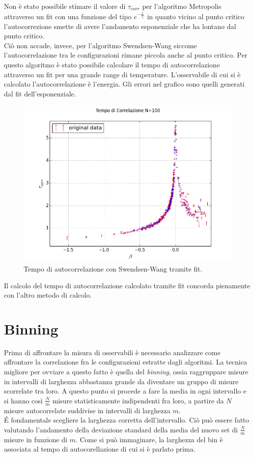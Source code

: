 Non è stato possibile stimare il valore di $\tau_{corr}$ per l'algoritmo Metropolis attraverso un fit con una funzione del tipo $e^{-\frac{t}{\tau_{c}}}$ in quanto vicino al punto critico l'autocorrezione smette di avere l'andamento esponenziale che ha lontano dal punto critico.\\
Ciò non accade, invece, per l'algoritmo Swendsen-Wang siccome l'autocorrelazione tra le configurazioni rimane piccola anche al punto critico.
Per questo algoritmo è stato possibile calcolare il tempo di autocorrelazione attraverso un fit per una grande range di temperature.
L'osservabile di cui si è calcolato l'autocorrelazione è l'energia.
Gli errori nel grafico sono quelli generati dal fit dell'esponenziale.

\begin{figure}
\centering
	\includegraphics[scale=0.55]{sw/autocorrelazioneN100fit.png}
	\caption{Tempo di autocorrelazione con Swendsen-Wang tramite fit.}
\end{figure}
Il calcolo del tempo di autocorrelazione calcolato tramite fit concorda pienamente con l'altro metodo di calcolo.\\


\section{Binning}
Prima di affrontare la misura di osservabili è necessario analizzare come affrontare la correlazione fra le configurazioni estratte dagli algoritmi.
La tecnica migliore per ovviare a questo fatto è quella del \emph{binning}, ossia raggruppare misure in intervalli di larghezza abbastanza grande da diventare un gruppo di misure scorrelate tra loro.
A questo punto si procede a fare la media in ogni intervallo e si hanno così $\frac{N}{m}$ misure statisticamente indipendenti fra loro, a partire da $N$ misure autocorrelate suddivise in intervalli di larghezza $m$.\\
\'E fondamentale scegliere la larghezza corretta dell'intervallo. Ciò può essere fatto valutando l'andamento
della deviazione standard della media del nuovo set di $\frac{N}{m}$ misure in funzione di $m$.
Come si può immaginare, la larghezza del bin è associata al tempo di autocorellazione di cui si è parlato prima.

